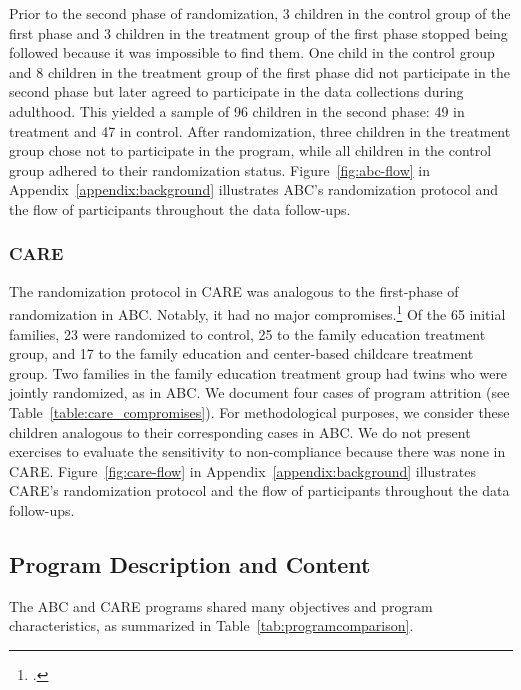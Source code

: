 \noindent Prior to the second phase of randomization, 3 children in the control group of the first phase and 3 children in the treatment group of the first phase stopped being followed because it was impossible to find them. One child in the control group and 8 children in the treatment group of the first phase did not participate in the second phase but later agreed to participate in the data collections during adulthood. This yielded a sample of 96 children in the second phase: 49 in treatment and 47 in control. After randomization, three children in the treatment group chose not to participate in the program, while all children in the control group adhered to their randomization status. Figure~\ref{fig:abc-flow} in Appendix~\ref{appendix:background} illustrates ABC's randomization protocol and the flow of participants throughout the data follow-ups.\\

\subsubsection{CARE}

\noindent The randomization protocol in CARE was analogous to the first-phase of randomization in ABC. Notably, it had no major compromises.\footnote{\citet{Bryant_et_al_1987_Carolina_Approach_TIECSE,Wasik_Ramey_etal_1990_CD,Burchinal_Campbell_etal_1997_CD}.} Of the 65 initial families, 23 were randomized to control, 25 to the family education treatment group, and 17 to the family education and center-based childcare treatment group. Two families in the family education treatment group had twins who were jointly randomized, as in ABC. We document four cases of program attrition (see Table~\ref{table:care_compromises}). For methodological purposes, we consider these children analogous to their corresponding cases in ABC. We do not present exercises to evaluate the sensitivity to non-compliance because there was none in CARE. Figure~\ref{fig:care-flow} in Appendix~\ref{appendix:background} illustrates CARE's randomization protocol and the flow of participants throughout the data follow-ups.\\



\subsection{Program Description and Content}

\noindent The ABC and CARE programs shared many objectives and program characteristics, as summarized in Table~\ref{tab:programcomparison}.\\

